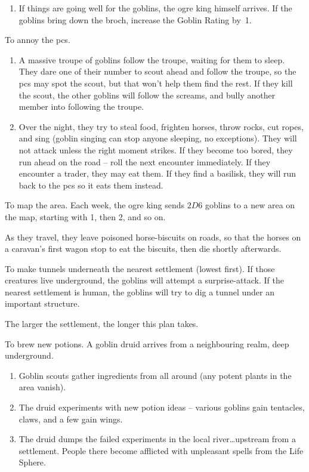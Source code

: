 \begin{multicols}{2}
\begin{dlist}
\begin{enumerate}
    From this point on, no more supplies reach the \gls{broch} -- the goblins eat every trader, including those with \glspl{guard}.
    If the troupe destroy the food, the goblins will be forced to attack directly.
    \item
    If things are going well for the goblins, the ogre king himself arrives.
    If the goblins bring down the \gls{broch}, increase the Goblin Rating by~1.
  \end{enumerate}
  \item
  To annoy the \glspl{pc}.
  \begin{enumerate}
    \item
    A massive troupe of goblins follow the troupe, waiting for them to sleep.
    They dare one of their number to scout ahead and follow the troupe, so the \glspl{pc} may spot the scout, but that won't help them find the rest.
    If they kill the scout, the other goblins will follow the screams, and bully another member into following the troupe.
    \item
    Over the night, they try to steal food, frighten horses, throw rocks, cut ropes, and sing (goblin singing can stop anyone sleeping, no exceptions).
    They will not attack unless the right moment strikes.
    If they become too bored, they run ahead on the road -- roll the next encounter immediately.
    If they encounter a trader, they may eat them.
    If they find a basilisk, they will run back to the \glspl{pc} so it eats them instead.
  \end{enumerate}
  \item
  To map the area.
  Each week, the ogre king sends $2D6$ goblins to a new area on the map, starting with 1, then 2, and so on.

  As they travel, they leave poisoned horse-biscuits on roads, so that the horses on a caravan's first wagon stop to eat the biscuits, then die shortly afterwards.
  \item
  To make tunnels underneath the nearest settlement (lowest first).
  If those creatures live underground, the goblins will attempt a surprise-attack.
  If the nearest settlement is human, the goblins will try to dig a tunnel under an important structure.

  The larger the settlement, the longer this plan takes.
  \item
  To brew new potions.
  A goblin druid arrives from a neighbouring realm, deep underground.
  \begin{enumerate}
    \item
    Goblin scouts gather \glspl{ingredient} from all around (any potent plants in the area vanish).
    \item
    The druid experiments with new potion ideas -- various goblins gain tentacles, claws, and a few gain wings.
    \item
    The druid dumps the failed experiments in the local river\ldots upstream from a settlement.
    People there become afflicted with unpleasant spells from the Life Sphere.
  \end{enumerate}
\end{dlist}

\end{multicols}

